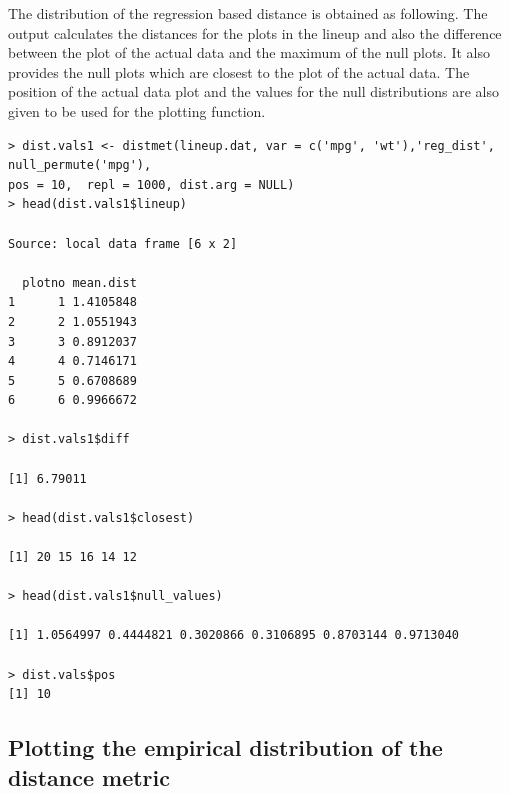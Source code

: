 The distribution of the regression based distance is obtained as following. The output calculates the distances for the plots in the lineup and also the difference between the plot of the actual data and the maximum of the null plots. It also provides the null plots which are closest to the plot of the actual data. The position of the actual data plot and the values for the null distributions are also given to be used for the plotting function. 

\begin{verbatim}
> dist.vals1 <- distmet(lineup.dat, var = c('mpg', 'wt'),'reg_dist', null_permute('mpg'), 
pos = 10,  repl = 1000, dist.arg = NULL)
> head(dist.vals1$lineup)

Source: local data frame [6 x 2]

  plotno mean.dist
1      1 1.4105848
2      2 1.0551943
3      3 0.8912037
4      4 0.7146171
5      5 0.6708689
6      6 0.9966672

> dist.vals1$diff

[1] 6.79011

> head(dist.vals1$closest)

[1] 20 15 16 14 12

> head(dist.vals1$null_values)

[1] 1.0564997 0.4444821 0.3020866 0.3106895 0.8703144 0.9713040

> dist.vals$pos
[1] 10

\end{verbatim}


\subsection{Plotting the empirical distribution of the distance
metric}\label{plotting-the-empirical-distribution-of-the-distance-metric}


